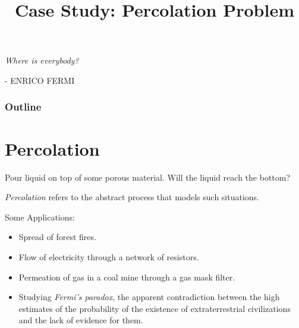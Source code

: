 \documentclass[8pt,a4paper,compress,handout]{beamer}
\title{Case Study: Percolation Problem}
\date{}
\begin{document}
\begin{frame}
\hfill
\begin{minipage}{150pt}
\begin{flushright}
\tiny \emph{Where is everybody?}

\smallskip

- ENRICO FERMI
\end{flushright}
\end{minipage}
\titlepage
\end{frame}

\begin{frame}
\frametitle{Outline}
\tableofcontents
\end{frame}

\section{Percolation}
\begin{frame}[fragile]
Pour liquid on top of some porous material. Will the liquid reach the bottom? 

\bigskip

\emph{Percolation} refers to the abstract process that models such situations.

\bigskip

Some Applications:
\begin{itemize}
\item Spread of forest fires.
\item Flow of electricity through a network of resistors.
\item Permeation of gas in a coal mine through a gas mask filter.
\item Studying \emph{Fermi's paradox}, the apparent contradiction between the high estimates of the probability of the existence of extraterrestrial civilizations and the lack of evidence for them.
\end{itemize}
\end{frame}
\end{document}
